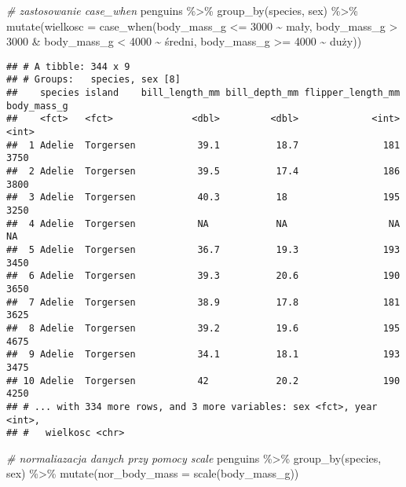 \documentclass[
]{book}
\newenvironment{Shaded}{\begin{snugshade}}{\end{snugshade}}
\newcommand{\AttributeTok}[1]{\textcolor[rgb]{0.77,0.63,0.00}{#1}}
\newcommand{\CommentTok}[1]{\textcolor[rgb]{0.56,0.35,0.01}{\textit{#1}}}
\newcommand{\DecValTok}[1]{\textcolor[rgb]{0.00,0.00,0.81}{#1}}
\newcommand{\FunctionTok}[1]{\textcolor[rgb]{0.00,0.00,0.00}{#1}}
\newcommand{\NormalTok}[1]{#1}
\newcommand{\SpecialCharTok}[1]{\textcolor[rgb]{0.00,0.00,0.00}{#1}}
\newcommand{\StringTok}[1]{\textcolor[rgb]{0.31,0.60,0.02}{#1}}
\begin{document}
\begin{Shaded}
\begin{Highlighting}[]
\CommentTok{\# zastosowanie case\_when}
\NormalTok{penguins }\SpecialCharTok{\%\textgreater{}\%} \FunctionTok{group\_by}\NormalTok{(species, sex) }\SpecialCharTok{\%\textgreater{}\%} \FunctionTok{mutate}\NormalTok{(}\AttributeTok{wielkosc =} \FunctionTok{case\_when}\NormalTok{(body\_mass\_g }\SpecialCharTok{\textless{}=} \DecValTok{3000} \SpecialCharTok{\textasciitilde{}} \StringTok{\textquotesingle{}mały\textquotesingle{}}\NormalTok{,}
\NormalTok{                                                                    body\_mass\_g }\SpecialCharTok{\textgreater{}} \DecValTok{3000} \SpecialCharTok{\&}\NormalTok{ body\_mass\_g }\SpecialCharTok{\textless{}} \DecValTok{4000} \SpecialCharTok{\textasciitilde{}} \StringTok{\textquotesingle{}średni\textquotesingle{}}\NormalTok{,}
\NormalTok{                                                                    body\_mass\_g }\SpecialCharTok{\textgreater{}=} \DecValTok{4000} \SpecialCharTok{\textasciitilde{}} \StringTok{\textquotesingle{}duży\textquotesingle{}}\NormalTok{))}
\end{Highlighting}
\end{Shaded}

\begin{verbatim}
## # A tibble: 344 x 9
## # Groups:   species, sex [8]
##    species island    bill_length_mm bill_depth_mm flipper_length_mm body_mass_g
##    <fct>   <fct>              <dbl>         <dbl>             <int>       <int>
##  1 Adelie  Torgersen           39.1          18.7               181        3750
##  2 Adelie  Torgersen           39.5          17.4               186        3800
##  3 Adelie  Torgersen           40.3          18                 195        3250
##  4 Adelie  Torgersen           NA            NA                  NA          NA
##  5 Adelie  Torgersen           36.7          19.3               193        3450
##  6 Adelie  Torgersen           39.3          20.6               190        3650
##  7 Adelie  Torgersen           38.9          17.8               181        3625
##  8 Adelie  Torgersen           39.2          19.6               195        4675
##  9 Adelie  Torgersen           34.1          18.1               193        3475
## 10 Adelie  Torgersen           42            20.2               190        4250
## # ... with 334 more rows, and 3 more variables: sex <fct>, year <int>,
## #   wielkosc <chr>
\end{verbatim}

\begin{Shaded}
\begin{Highlighting}[]
\CommentTok{\# normaliazacja danych przy pomocy scale}
\NormalTok{penguins }\SpecialCharTok{\%\textgreater{}\%} \FunctionTok{group\_by}\NormalTok{(species, sex) }\SpecialCharTok{\%\textgreater{}\%} \FunctionTok{mutate}\NormalTok{(}\AttributeTok{nor\_body\_mass =} \FunctionTok{scale}\NormalTok{(body\_mass\_g))}
\end{Highlighting}
\end{Shaded}
\end{document}
